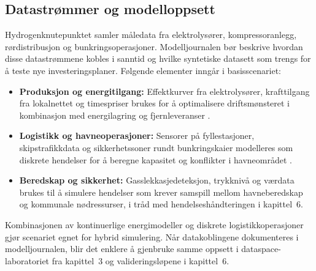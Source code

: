 \subsection{Datastrømmer og modelloppsett}
Hydrogenknutepunktet samler måledata fra elektrolysører, kompressoranlegg, rørdistribusjon og bunkringsoperasjoner. Modelljournalen bør beskrive hvordan disse datastrømmene kobles i sanntid og hvilke syntetiske datasett som trengs for å teste nye investeringsplaner. Følgende elementer inngår i basisscenariet:
\begin{itemize}
    \item \textbf{Produksjon og energitilgang:} Effektkurver fra elektrolysører, krafttilgang fra lokalnettet og timespriser brukes for å optimalisere driftsmønsteret i kombinasjon med energilagring og fjernleveranser \citep{dnv2023hydrogenforecast}.
    \item \textbf{Logistikk og havneoperasjoner:} Sensorer på fyllestasjoner, skipstrafikkdata og sikkerhetssoner rundt bunkringskaier modelleres som diskrete hendelser for å beregne kapasitet og konflikter i havneområdet \citep{heroya2024hydrogenhub}.
    \item \textbf{Beredskap og sikkerhet:} Gasslekkasjedeteksjon, trykknivå og værdata brukes til å simulere hendelser som krever samspill mellom havneberedskap og kommunale nødressurser, i tråd med hendelseshåndteringen i kapittel~6.
\end{itemize}
Kombinasjonen av kontinuerlige energimodeller og diskrete logistikkoperasjoner gjør scenariet egnet for hybrid simulering. Når datakoblingene dokumenteres i modelljournalen, blir det enklere å gjenbruke samme oppsett i dataspace-laboratoriet fra kapittel~3 og valideringsløpene i kapittel~6.

